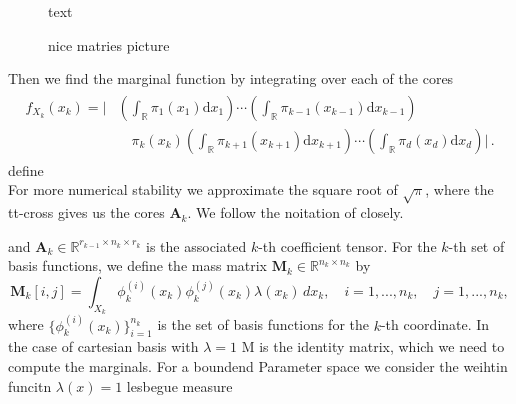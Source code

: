 \begin{figure}[ht!]
	\centering
{} 
\caption{text}
\label{key}
	
\end{figure}


\begin{figure}[ht!]
	\centering

	\caption{nice matries picture}
	\label{key}
	
\end{figure}


Then we find the marginal function by integrating over each of the cores
\begin{align}
	\begin{split}
	f_{X_k}(x_k) = 
	\Big|  &\left( \int_{\mathbb{R}} \pi_{1}(x_1)\text{d}x_{1} \right) \cdots \left( \int_{\mathbb{R}} \pi_{k-1}(x_{k-1})\text{d}x_{k-1} \right) \\ & \quad{} \pi_{k}(x_k) \left( \int_{\mathbb{R}} \pi_{k+1}(x_{k+1})\text{d}x_{k+1} \right) \cdots  \left( \int_{\mathbb{R}} \pi_{d}(x_d)\text{d}x_d \right) \Big| \, .
	\end{split} 
\end{align}
define
\\


For more numerical stability we approximate the square root of $\sqrt{\pi}$, where the tt-cross \cite{} gives us the cores $\bm{A}_k$.
We follow the noitation of \cite{} closely.


 and $\bm{A}_k \in \mathbb{R}^{r_{k-1} \times n_k \times r_k}$ is the associated $k$-th coefficient tensor. For the $k$-th set of basis functions, we define the mass matrix $\bm{M}_k \in \mathbb{R}^{n_k \times n_k}$ by
\begin{equation}
	\bm{M}_k[i, j] = \int_{X_k} \phi^{(i)}_k(x_k) \phi^{(j)}_k(x_k) \lambda(x_k) \,dx_k, \quad i = 1, ..., n_k, \quad j = 1, ..., n_k,
\end{equation}
where $\{\phi^{(i)}_k(x_k)\}_{i=1}^{n_k}$ is the set of basis functions for the $k$-th coordinate.
In the case of cartesian basis with $\lambda= 1$ M is the identity matrix, which we need to compute the marginals.
For a boundend Parameter space we consider the weihtin funcitn $\lambda(x) = 1$
lesbegue measure 
